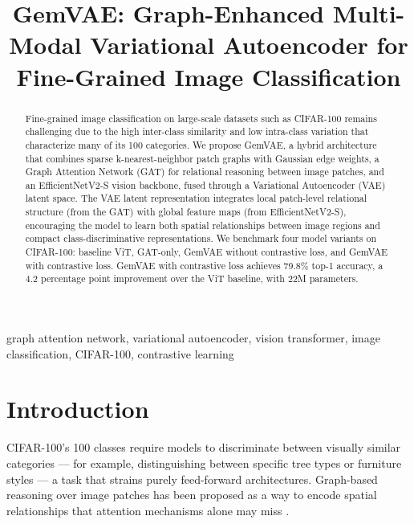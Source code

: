 \documentclass[conference]{IEEEtran}
\begin{document}
\title{GemVAE: Graph-Enhanced Multi-Modal Variational Autoencoder for Fine-Grained Image Classification}

\author{
}

\maketitle

\begin{abstract}
Fine-grained image classification on large-scale datasets such as CIFAR-100 remains challenging due to the high inter-class similarity and low intra-class variation that characterize many of its 100 categories. We propose GemVAE, a hybrid architecture that combines sparse k-nearest-neighbor patch graphs with Gaussian edge weights, a Graph Attention Network (GAT) for relational reasoning between image patches, and an EfficientNetV2-S vision backbone, fused through a Variational Autoencoder (VAE) latent space. The VAE latent representation integrates local patch-level relational structure (from the GAT) with global feature maps (from EfficientNetV2-S), encouraging the model to learn both spatial relationships between image regions and compact class-discriminative representations. We benchmark four model variants on CIFAR-100: baseline ViT, GAT-only, GemVAE without contrastive loss, and GemVAE with contrastive loss. GemVAE with contrastive loss achieves 79.8\% top-1 accuracy, a 4.2 percentage point improvement over the ViT baseline, with 22M parameters.
\end{abstract}

\begin{IEEEkeywords}
graph attention network, variational autoencoder, vision transformer, image classification, CIFAR-100, contrastive learning
\end{IEEEkeywords}

\section{Introduction}

CIFAR-100's 100 classes require models to discriminate between visually similar categories — for example, distinguishing between specific tree types or furniture styles — a task that strains purely feed-forward architectures. Graph-based reasoning over image patches has been proposed as a way to encode spatial relationships that attention mechanisms alone may miss \cite{han2022vision}.
\end{document}
